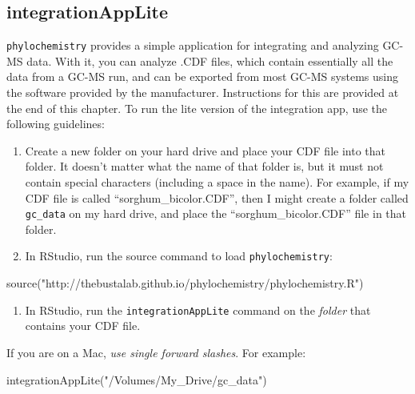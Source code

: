 \documentclass[
]{krantz}
\newenvironment{Shaded}{\begin{snugshade}}{\end{snugshade}}
\newcommand{\FunctionTok}[1]{\textcolor[rgb]{0.00,0.00,0.00}{#1}}
\newcommand{\NormalTok}[1]{#1}
\newcommand{\StringTok}[1]{\textcolor[rgb]{0.31,0.60,0.02}{#1}}
\providecommand{\tightlist}{%
  \setlength{\itemsep}{0pt}\setlength{\parskip}{0pt}}
\begin{document}
\hypertarget{integrationapplite}{%
\subsection{integrationAppLite}\label{integrationapplite}}

\texttt{phylochemistry} provides a simple application for integrating and analyzing GC-MS data. With it, you can analyze .CDF files, which contain essentially all the data from a GC-MS run, and can be exported from most GC-MS systems using the software provided by the manufacturer. Instructions for this are provided at the end of this chapter. To run the lite version of the integration app, use the following guidelines:

\begin{enumerate}
\def\labelenumi{\arabic{enumi}.}
\item
  Create a new folder on your hard drive and place your CDF file into that folder. It doesn't matter what the name of that folder is, but it must not contain special characters (including a space \texttt{} in the name). For example, if my CDF file is called ``sorghum\_bicolor.CDF'', then I might create a folder called \texttt{gc\_data} on my hard drive, and place the ``sorghum\_bicolor.CDF'' file in that folder.
\item
  In RStudio, run the source command to load \texttt{phylochemistry}:
\end{enumerate}

\begin{Shaded}
\begin{Highlighting}[]
\FunctionTok{source}\NormalTok{(}\StringTok{"http://thebustalab.github.io/phylochemistry/phylochemistry.R"}\NormalTok{)}
\end{Highlighting}
\end{Shaded}

\hfill\break

\begin{enumerate}
\def\labelenumi{\arabic{enumi}.}
\setcounter{enumi}{2}
\tightlist
\item
  In RStudio, run the \texttt{integrationAppLite} command on the \emph{folder} that contains your CDF file.\\
\end{enumerate}

If you are on a Mac, \emph{use single forward slashes}. For example:

\begin{Shaded}
\begin{Highlighting}[]
\FunctionTok{integrationAppLite}\NormalTok{(}\StringTok{"/Volumes/My\_Drive/gc\_data"}\NormalTok{)}
\end{Highlighting}
\end{Shaded}
\end{document}
